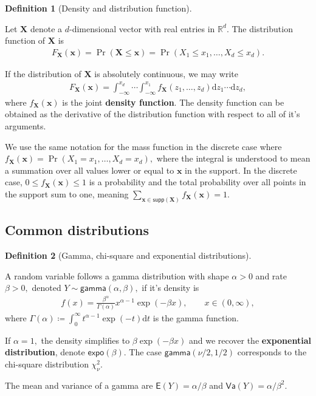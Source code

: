 \documentclass[
  11pt,
  letterpaper,
]{scrbook}
\theoremstyle{definition}
\theoremstyle{plain}
\theoremstyle{plain}
\theoremstyle{plain}
\theoremstyle{definition}
\theoremstyle{definition}
\newtheorem{definition}{Definition}[chapter]
\theoremstyle{plain}
\theoremstyle{plain}
\theoremstyle{remark}
\begin{document}
\begin{definition}[Density and distribution
function]\protect\hypertarget{def-cdf}{}\label{def-cdf}

Let \(\boldsymbol{X}\) denote a \(d\)-dimensional vector with real
entries in \(\mathbb{R}^d.\) The distribution function of
\(\boldsymbol{X}\) is \begin{align*}
 F_{\boldsymbol{X}}(\boldsymbol{x}) = \Pr(\boldsymbol{X} \leq \boldsymbol{x}) = \Pr(X_1 \leq x_1, \ldots, X_d \leq x_d).
\end{align*}

If the distribution of \(\boldsymbol{X}\) is absolutely continuous, we
may write \begin{align*}
 F_{\boldsymbol{X}}(\boldsymbol{x}) = \int_{-\infty}^{x_d} \cdots \int_{-\infty}^{x_1} f_{\boldsymbol{X}}(z_1, \ldots, z_d) \mathrm{d} z_1 \cdots \mathrm{d} z_d,
\end{align*} where \(f_{\boldsymbol{X}}(\boldsymbol{x})\) is the joint
\textbf{density function}. The density function can be obtained as the
derivative of the distribution function with respect to all of it's
arguments.

We use the same notation for the mass function in the discrete case
where
\(f_{\boldsymbol{X}}(\boldsymbol{x}) = \Pr(X_1 = x_1, \ldots, X_d = x_d),\)
where the integral is understood to mean a summation over all values
lower or equal to \(\boldsymbol{x}\) in the support. In the discrete
case, \(0 \leq f_{\boldsymbol{X}}(\boldsymbol{x}) \leq 1\) is a
probability and the total probability over all points in the support sum
to one, meaning
\(\sum_{\boldsymbol{x} \in \mathsf{supp}(\boldsymbol{X})} f_{\boldsymbol{X}}(\boldsymbol{x}) = 1.\)

\end{definition}

\subsection{Common distributions}\label{common-distributions}

\begin{definition}[Gamma, chi-square and exponential
distributions]\protect\hypertarget{def-gamma}{}\label{def-gamma}

A random variable follows a gamma distribution with shape \(\alpha>0\)
and rate \(\beta>0,\) denoted \(Y \sim \mathsf{gamma}(\alpha, \beta),\)
if it's density is \begin{align*}
f(x) = \frac{\beta^\alpha}{\Gamma(\alpha)}x^{\alpha-1}\exp(-\beta x), \qquad x \in (0, \infty),
\end{align*} where
\(\Gamma(\alpha)\coloneqq\int_0^\infty t^{\alpha-1}\exp(-t)\mathrm{d} t\)
is the gamma function.

If \(\alpha=1,\) the density simplifies to \(\beta \exp(-\beta x)\) and
we recover the \textbf{exponential distribution}, denote
\(\mathsf{expo}(\beta).\) The case \(\mathsf{gamma}(\nu/2, 1/2)\)
corresponds to the chi-square distribution \(\chi^2_\nu.\)

The mean and variance of a gamma are \(\mathsf{E}(Y)=\alpha/\beta\) and
\(\mathsf{Va}(Y)=\alpha/\beta^2\).

\end{definition}
\end{document}
